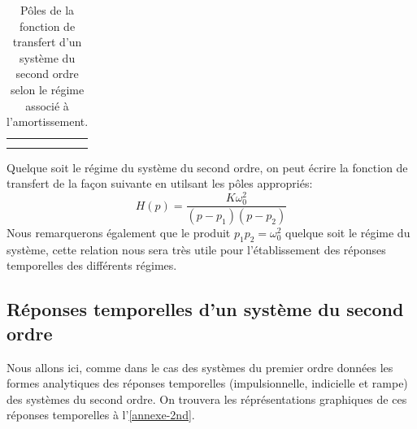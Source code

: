 \begin{table}[!h]
\begin{center}
{\begin{tabular}{M{4cm}M{4.0cm}M{8.0cm}N}
           &\\ [1.5em]
        \hhline{===}
    \end{tabular}
}
    \end{center}
    \caption{Pôles de la fonction de transfert d'un système du second ordre 
    selon le régime associé à l'amortissement.\label{tab-poles_2nd}}
\end{table}
Quelque soit le régime du système du second ordre, on peut écrire la fonction de transfert de la façon suivante en 
utilsant les pôles appropriés:
$$
H(p)=\dfrac{K\omega^2_0}{(p-p_1)(p-p_2)}
$$
Nous remarquerons également que le produit $p_1p_2=\omega^2_0$ quelque soit le régime du système, cette relation 
nous sera très utile pour l'établissement des réponses temporelles des différents régimes.

\subsection{Réponses temporelles d'un système du second ordre}
Nous allons ici, comme dans le cas des systèmes du premier ordre données les formes analytiques des
réponses temporelles (impulsionnelle, indicielle et rampe) des systèmes du second ordre.
On trouvera les réprésentations graphiques de ces réponses temporelles à l'\cref{annexe-2nd}.
